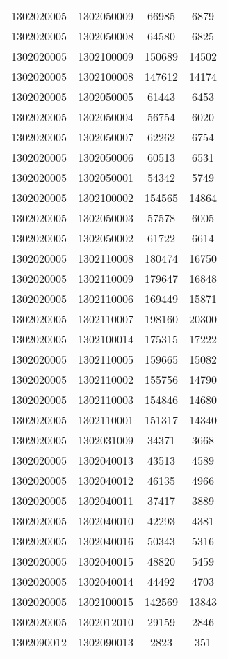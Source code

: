 \begin{longtable}[h]{llcc}
		1302020005 & 1302050009 & 66985 & 6879\\
		1302020005 & 1302050008 & 64580 & 6825\\
		1302020005 & 1302100009 & 150689 & 14502\\
		1302020005 & 1302100008 & 147612 & 14174\\
		1302020005 & 1302050005 & 61443 & 6453\\
		1302020005 & 1302050004 & 56754 & 6020\\
		1302020005 & 1302050007 & 62262 & 6754\\
		1302020005 & 1302050006 & 60513 & 6531\\
		1302020005 & 1302050001 & 54342 & 5749\\
		1302020005 & 1302100002 & 154565 & 14864\\
		1302020005 & 1302050003 & 57578 & 6005\\
		1302020005 & 1302050002 & 61722 & 6614\\
		1302020005 & 1302110008 & 180474 & 16750\\
		1302020005 & 1302110009 & 179647 & 16848\\
		1302020005 & 1302110006 & 169449 & 15871\\
		1302020005 & 1302110007 & 198160 & 20300\\
		1302020005 & 1302100014 & 175315 & 17222\\
		1302020005 & 1302110005 & 159665 & 15082\\
		1302020005 & 1302110002 & 155756 & 14790\\
		1302020005 & 1302110003 & 154846 & 14680\\
		1302020005 & 1302110001 & 151317 & 14340\\
		1302020005 & 1302031009 & 34371 & 3668\\
		1302020005 & 1302040013 & 43513 & 4589\\
		1302020005 & 1302040012 & 46135 & 4966\\
		1302020005 & 1302040011 & 37417 & 3889\\
		1302020005 & 1302040010 & 42293 & 4381\\
		1302020005 & 1302040016 & 50343 & 5316\\
		1302020005 & 1302040015 & 48820 & 5459\\
		1302020005 & 1302040014 & 44492 & 4703\\
		1302020005 & 1302100015 & 142569 & 13843\\
		1302020005 & 1302012010 & 29159 & 2846\\
		1302090012 & 1302090013 & 2823 & 351\\

\end{longtable}
